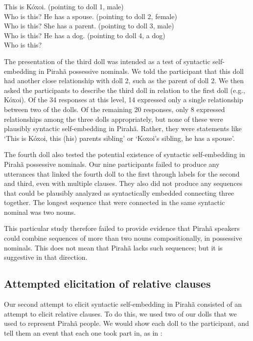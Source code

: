 \documentclass{article}
\begin{document}
\eal
\label{kohoi_ex}
\ex \label{kohoi_ex1} This is Kóxoi. (pointing to doll 1, male)\\
Who is this?
\ex \label{kohoi_ex2} He has a spouse. (pointing to doll 2, female)\\
Who is this?
\ex \label{kohoi_ex3} She has a parent. (pointing to doll 3, male)\\
Who is this?
\ex \label{kohoi_ex4} He has a dog. (pointing to doll 4, a dog)\\
Who is this?
\zl

The presentation of the third doll was intended as a test of syntactic self-embedding in Pirahã possessive nominals.  We told the participant that this doll had another close relationship with doll 2, such as the parent of doll 2.  We then asked the participants to describe the third doll in relation to the first doll (e.g., Kóxoi).  Of the 34 responses at this level, 14 expressed only a single relationship between two of the dolls.  Of the remaining 20 responses, only 8 expressed relationships among the three dolls appropriately, but none of these were plausibly syntactic self-embedding in Pirahã.  Rather, they were statements like ‘This is Kóxoi, this (his) parents sibling’ or ‘Koxoi’s sibling, he has a spouse’.

The fourth doll also tested the potential existence of syntactic self-embedding in Pirahã possessive nominals. Our nine participants failed to produce any utterances that linked the fourth doll to the first through labels for the second and third, even with multiple clauses.  They also did not produce any sequences that could be plausibly analyzed as syntactically embedded connecting three together. The longest sequence that were connected in the same syntactic nominal was two nouns.

This particular study therefore failed to provide evidence that Pirahã speakers could combine sequences of more than two nouns compositionally, in possessive nominals.  This does not mean that Pirahã lacks such sequences; but it is suggestive in that direction.

\subsection{Attempted elicitation of relative clauses}

Our second attempt to elicit syntactic self-embedding in Pirahã consisted of an attempt to elicit relative clauses.  To do this, we used two of our dolls that we used to represent Pirahã people. We would show each doll to the participant, and tell them an event that each one took part in, as in :
\end{document}
